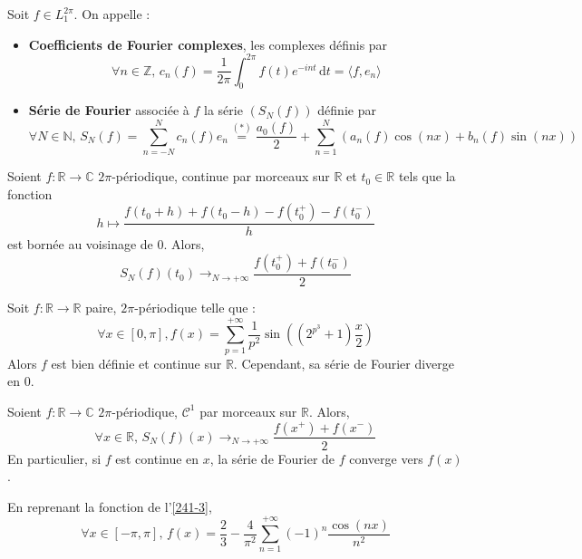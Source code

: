 
  \begin{definition}
    Soit $f \in L_1^{2\pi}$. On appelle :
    \begin{itemize}
      \item \textbf{Coefficients de Fourier complexes}, les complexes définis par
      \[ \forall n \in \mathbb{Z}, \, c_n(f) = \frac{1}{2 \pi} \int_0^{2\pi} f(t) e^{-int} \, \mathrm{d}t = \langle f, e_n \rangle \]
      \item \textbf{Série de Fourier} associée à $f$ la série $(S_N(f))$ définie par
      \[ \forall N \in \mathbb{N}, \, S_N(f) = \sum_{n=-N}^{N} c_n(f) e_n \overset{(*)}{=} \frac{a_0(f)}{2} + \sum_{n = 1}^N (a_n(f) \cos(nx) + b_n(f) \sin(nx)) \]
    \end{itemize}
  \end{definition}


  \begin{theorem}
    Soient $f : \mathbb{R} \rightarrow \mathbb{C}$ $2\pi$-périodique, continue par morceaux sur $\mathbb{R}$ et $t_0 \in \mathbb{R}$ tels que la fonction
    \[ h \mapsto \frac{f(t_0 + h) + f(t_0 - h) - f(t_0^+) - f(t_0^-)}{h} \]
    est bornée au voisinage de $0$. Alors,
    \[ S_N(f)(t_0) \longrightarrow_{N \rightarrow +\infty} \frac{f(t_0^+) + f(t_0^-)}{2} \]
  \end{theorem}

  \begin{cexample}
    Soit $f : \mathbb{R} \rightarrow \mathbb{R}$ paire, $2\pi$-périodique telle que :
    \[ \forall x \in [0, \pi], f(x) = \sum_{p=1}^{+\infty} \frac{1}{p^2} \sin \left( (2^{p^3} + 1) \frac{x}{2} \right)
    \]
    Alors $f$ est bien définie et continue sur $\mathbb{R}$. Cependant, sa série de Fourier diverge en $0$.
  \end{cexample}

  \begin{corollary}
    Soient $f : \mathbb{R} \rightarrow \mathbb{C}$ $2\pi$-périodique, $\mathcal{C}^1$ par morceaux sur $\mathbb{R}$. Alors,
    \[ \forall x \in \mathbb{R}, \, S_N(f)(x) \longrightarrow_{N \rightarrow +\infty} \frac{f(x^+) + f(x^-)}{2} \]
    En particulier, si $f$ est continue en $x$, la série de Fourier de $f$ converge vers $f(x)$.
  \end{corollary}

  \begin{example}
    \label{241-3}
    En reprenant la fonction de l'\cref{241-3},
    \[ \forall x \in [-\pi, \pi], \, f(x) = \frac{2}{3} - \frac{4}{\pi^2} \sum_{n=1}^{+\infty} (-1)^n \frac{\cos(nx)}{n^2} \]
  \end{example}

